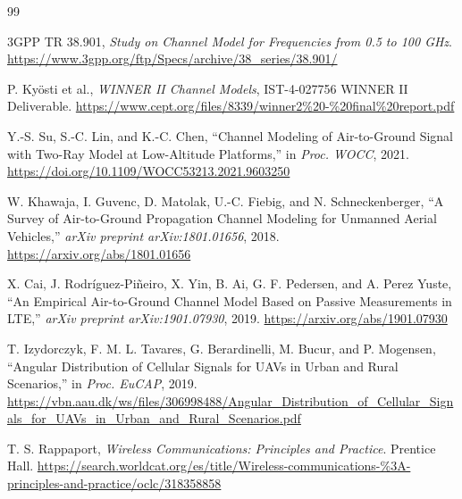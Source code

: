 \documentclass[11pt,a4paper]{article}
\begin{document}
\begin{thebibliography}{99}

3GPP TR 38.901,
\emph{Study on Channel Model for Frequencies from 0.5 to 100 GHz}.
\url{https://www.3gpp.org/ftp/Specs/archive/38_series/38.901/}

P. Ky\"osti et al.,
\emph{WINNER II Channel Models},
IST-4-027756 WINNER II Deliverable.
\url{https://www.cept.org/files/8339/winner2\%20-\%20final\%20report.pdf}

Y.-S. Su, S.-C. Lin, and K.-C. Chen,
``Channel Modeling of Air-to-Ground Signal with Two-Ray Model at Low-Altitude Platforms,''
in \emph{Proc. WOCC}, 2021.
\url{https://doi.org/10.1109/WOCC53213.2021.9603250}

W. Khawaja, I. Guvenc, D. Matolak, U.-C. Fiebig, and N. Schneckenberger,
``A Survey of Air-to-Ground Propagation Channel Modeling for Unmanned Aerial Vehicles,''
\emph{arXiv preprint arXiv:1801.01656}, 2018.
\url{https://arxiv.org/abs/1801.01656}

X. Cai, J. Rodr\'iguez-Pi\~neiro, X. Yin, B. Ai, G. F. Pedersen, and A. Perez Yuste,
``An Empirical Air-to-Ground Channel Model Based on Passive Measurements in LTE,''
\emph{arXiv preprint arXiv:1901.07930}, 2019.
\url{https://arxiv.org/abs/1901.07930}

T. Izydorczyk, F. M. L. Tavares, G. Berardinelli, M. Bucur, and P. Mogensen,
``Angular Distribution of Cellular Signals for UAVs in Urban and Rural Scenarios,''
in \emph{Proc. EuCAP}, 2019.
\url{https://vbn.aau.dk/ws/files/306998488/Angular_Distribution_of_Cellular_Signals_for_UAVs_in_Urban_and_Rural_Scenarios.pdf}

T. S. Rappaport,
\emph{Wireless Communications: Principles and Practice}.
Prentice Hall.
\url{https://search.worldcat.org/es/title/Wireless-communications-%3A-principles-and-practice/oclc/318358858}

\end{thebibliography}
\end{document}
